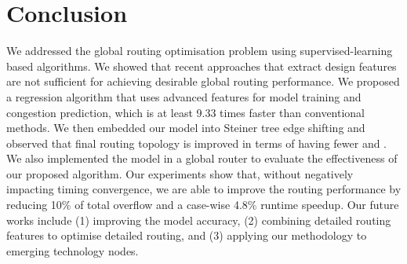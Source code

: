 \section{Conclusion}
\label{sec:conlu}

We addressed the global routing optimisation problem using supervised-learning based algorithms.
We showed that recent approaches that extract design features are not sufficient for achieving desirable global routing performance.
We proposed a regression algorithm that uses advanced features for model training and congestion prediction, which is at least 9.33 times faster than conventional methods.
We then embedded our model into Steiner tree edge shifting and observed that final  routing topology is improved in terms of having fewer  and .
We also implemented the model in a global router to evaluate the effectiveness of our proposed algorithm.
Our experiments show that, without negatively impacting timing convergence, we are able to improve the routing performance by reducing 10\% of total overflow and a case-wise 4.8\% runtime speedup.
Our future works include (1) improving the model accuracy, (2) combining  detailed routing features to optimise detailed routing, and (3) applying our methodology to emerging technology nodes.
